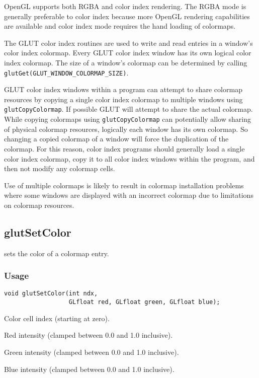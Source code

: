 OpenGL supports both RGBA and color index rendering.  The RGBA mode is generally
preferable to color index because more OpenGL rendering capabilities are
available and color index mode requires the hand loading of colormaps.

The GLUT color index routines are used to write and read entries in a window's
color index colormap.  Every GLUT color index window has its own logical color
index colormap.  The size of a window's colormap can be determined by calling
{\tt glutGet(GLUT\_WINDOW\_COLORMAP\_SIZE)}.

GLUT color index windows within a program can attempt to share colormap resources
by copying a single color index colormap to multiple windows using {\tt glutCopyColormap}.
If possible GLUT will attempt to share the actual colormap.  While copying
colormaps using {\tt glutCopyColormap} can potentially allow sharing of
physical colormap resources, logically each window has its own colormap.  So
changing a copied colormap of a window will force the duplication of the colormap.
For this reason, color index programs should generally load a single color index
colormap, copy it to all color index windows within the program, and then not
modify any colormap cells.

Use of multiple colormaps is likely to result in
colormap installation problems where some windows are
displayed with an incorrect colormap due to limitations on colormap
resources.

\subsection{glutSetColor}

 sets the color of a colormap entry.

\subsubsection*{Usage}
\begin{verbatim}
void glutSetColor(int ndx,
                  GLfloat red, GLfloat green, GLfloat blue);
\end{verbatim}
\begin{description}
\itemsep 0in
\item[\tt ndx]
Color cell index (starting at zero).
\item[\tt red]
Red intensity (clamped between 0.0 and 1.0 inclusive).
\item[\tt green]
Green intensity (clamped between 0.0 and 1.0 inclusive).
\item[\tt blue]
Blue intensity (clamped between 0.0 and 1.0 inclusive).
\end{description}

